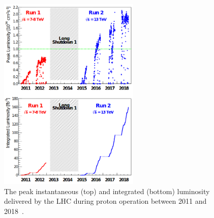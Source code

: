 \begin{figure}
\centering
\includegraphics[width=0.6\textwidth]{figures/lhc_and_cms/lhc_lumi.png}
\caption{The peak instantaneous (top) and integrated (bottom) luminosity delivered by the LHC during proton operation between 2011 and 2018~\cite{lhc_run2_operation}.}
\label{lhc_lumi}
\end{figure}